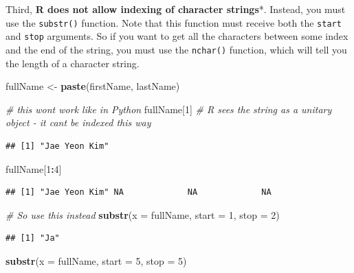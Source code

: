 \documentclass[
]{book}
\newenvironment{Shaded}{\begin{snugshade}}{\end{snugshade}}
\newcommand{\AttributeTok}[1]{\textcolor[rgb]{0.13,0.29,0.53}{#1}}
\newcommand{\CommentTok}[1]{\textcolor[rgb]{0.56,0.35,0.01}{\textit{#1}}}
\newcommand{\DecValTok}[1]{\textcolor[rgb]{0.00,0.00,0.81}{#1}}
\newcommand{\FunctionTok}[1]{\textcolor[rgb]{0.13,0.29,0.53}{\textbf{#1}}}
\newcommand{\NormalTok}[1]{#1}
\newcommand{\OtherTok}[1]{\textcolor[rgb]{0.56,0.35,0.01}{#1}}
\newcommand{\SpecialCharTok}[1]{\textcolor[rgb]{0.81,0.36,0.00}{\textbf{#1}}}
\begin{document}
Third, \textbf{R does not allow indexing of character strings}*. Instead, you must use the \texttt{substr()} function. Note that this function must receive both the \texttt{start} and \texttt{stop} arguments. So if you want to get all the characters between some index and the end of the string, you must use the \texttt{nchar()} function, which will tell you the length of a character string.

\begin{Shaded}
\begin{Highlighting}[]
\NormalTok{fullName }\OtherTok{\textless{}{-}} \FunctionTok{paste}\NormalTok{(firstName, lastName)}

\CommentTok{\# this won\textquotesingle{}t work like in Python}
\NormalTok{fullName[}\DecValTok{1}\NormalTok{] }\CommentTok{\# R sees the string as a unitary object {-} it can\textquotesingle{}t be indexed this way}
\end{Highlighting}
\end{Shaded}

\begin{verbatim}
## [1] "Jae Yeon Kim"
\end{verbatim}

\begin{Shaded}
\begin{Highlighting}[]
\NormalTok{fullName[}\DecValTok{1}\SpecialCharTok{:}\DecValTok{4}\NormalTok{]}
\end{Highlighting}
\end{Shaded}

\begin{verbatim}
## [1] "Jae Yeon Kim" NA             NA             NA
\end{verbatim}

\begin{Shaded}
\begin{Highlighting}[]
\CommentTok{\# So use this instead}
\FunctionTok{substr}\NormalTok{(}\AttributeTok{x =}\NormalTok{ fullName, }\AttributeTok{start =} \DecValTok{1}\NormalTok{, }\AttributeTok{stop =} \DecValTok{2}\NormalTok{)}
\end{Highlighting}
\end{Shaded}

\begin{verbatim}
## [1] "Ja"
\end{verbatim}

\begin{Shaded}
\begin{Highlighting}[]
\FunctionTok{substr}\NormalTok{(}\AttributeTok{x =}\NormalTok{ fullName, }\AttributeTok{start =} \DecValTok{5}\NormalTok{, }\AttributeTok{stop =} \DecValTok{5}\NormalTok{)}
\end{Highlighting}
\end{Shaded}
\end{document}

